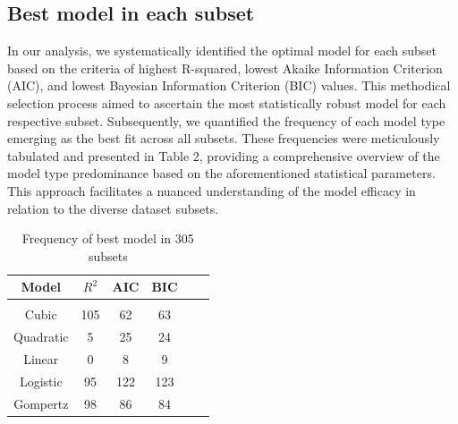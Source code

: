 \documentclass[11pt]{article}
\begin{document}
\subsection{Best model in each subset}
In our analysis, we systematically identified the optimal model for each subset based on the criteria of highest R-squared, lowest Akaike Information Criterion (AIC), and lowest Bayesian Information Criterion (BIC) values. This methodical selection process aimed to ascertain the most statistically robust model for each respective subset. Subsequently, we quantified the frequency of each model type emerging as the best fit across all subsets. These frequencies were meticulously tabulated and presented in Table 2, providing a comprehensive overview of the model type predominance based on the aforementioned statistical parameters. This approach facilitates a nuanced understanding of the model efficacy in relation to the diverse dataset subsets.
\hfill\break
 \begin{table}[ht]
     \centering
     \begin{tabular}{cccccc}
         Model & $R^2$ & AIC & BIC \\
         \hline
         & & & & \\
          Cubic & 105 & 62 & 63   \\
          Quadratic & 5 & 25 & 24   \\
          Linear & 0 & 8 &  9  \\
          Logistic & 95 & 122 & 123 \\
          Gompertz & 98 & 86 & 84 \\
          \hline
     \end{tabular}
     \caption{Frequency of best model in 305 subsets}
     \label{tab:my_label}
 \end{table}
\end{document}
